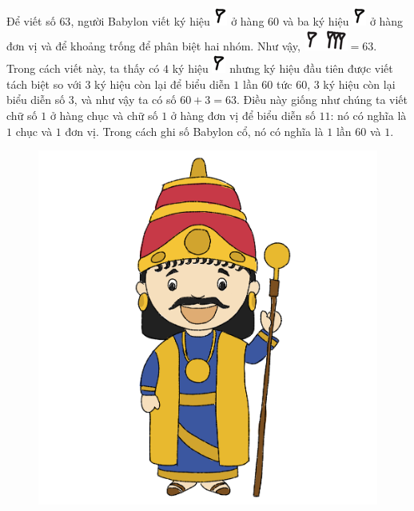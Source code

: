 \begin{multicols}{2}
	\vskip 0.1cm
	Để viết số $63$, người Babylon viết ký hiệu  \includegraphics[scale=0.7]{15}  ở hàng $60$ và ba ký hiệu \includegraphics[scale=0.7]{15}  ở hàng đơn vị và để khoảng trống để phân biệt hai nhóm.
	\vskip 0.1cm
	Như vậy, \includegraphics[scale=0.7]{16.1}$=63$. Trong cách viết này, ta thấy có $4$ ký hiệu \includegraphics[scale=0.7]{15}   nhưng ký hiệu đầu tiên được viết tách biệt so với $3$ ký hiệu còn lại để biểu diễn $1$ lần $60$ tức $60$, $3$ ký hiệu còn lại biểu diễn số $3$, và như vậy ta có số $60+3 =63$.
	\vskip 0.1cm
	Điều này giống như chúng ta viết chữ số $1$ ở hàng chục và chữ số $1$ ở hàng đơn vị để biểu diễn số $11$: nó có nghĩa là $1$ chục và $1$ đơn vị. Trong  cách ghi số  Babylon cổ, nó có nghĩa là $1$ lần $60$  và $1$.
	\begin{figure}[H]
		\centering
		\vspace*{-5pt}
		\captionsetup{labelformat= empty, justification=centering}
		\includegraphics[width=0.85\linewidth]{20.12-pi.2}

\end{figure}
\end{multicols}
